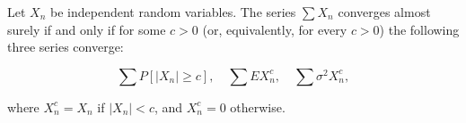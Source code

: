 Let $X_n$ be independent random variables. The series $\sum X_n$ converges almost surely if and only if for some $c > 0$ (or, equivalently, for every $c > 0$) the following three series converge:

$$\sum P[|X_n| \geq c], \quad \sum E X_n^c, \quad \sum \sigma^2 X_n^c,$$

where $X_n^c = X_n$ if $|X_n| < c$, and $X_n^c = 0$ otherwise.

